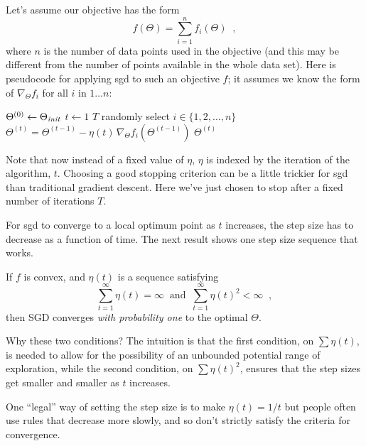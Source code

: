 Let's assume our objective has the form
\[
  f(\Theta) = \sum_{i = 1}^n f_i(\Theta)
  \;\;,
\]
where $n$ is the number of data points used in the objective (and this
may be different from the number of points available in the whole data
set).  Here is pseudocode for applying {\sc sgd} to such an objective $f$;
it assumes we know the form of $\nabla_\Theta f_i$ for all $i$ in
$1\ldots n$:
\begin{codebox}
  \li $\Theta^{(0)} \gets \Theta_{\it init}$
  \li \For $t \gets 1$ \To $T$
  \li \Do
  randomly select $i \in \{1, 2, \dots, n\}$
  \li   $\Theta^{(t)} = \Theta^{(t-1)} - \eta(t) \, \nabla_\Theta f_i(\Theta^{(t-1)})$
  \End
  \li \Return $\Theta^{(t)}$
\end{codebox}

Note that now instead of a fixed  value of $\eta$, $\eta$ is indexed by
the iteration of the algorithm, $t$.
Choosing a good stopping criterion can be a little trickier for {\sc sgd} than
traditional gradient descent. Here we've just chosen
to stop after a fixed number of iterations $T$.

For {\sc sgd} to converge to a local optimum point as $t$ increases, the
step size has to decrease as a function of time. The next result shows one
step size sequence that works.

\begin{theorem}
  If $f$ is convex, and $\eta(t)$ is a sequence satisfying
  $$ \sum_{t = 1}^{\infty}\eta(t) = \infty \;\;\text{and}\;\;
    \sum_{t = 1}^{\infty}\eta(t)^2 < \infty \;\;,$$
  then SGD converges {\em with probability one}
  to the optimal $\Theta$.
\end{theorem}

Why these two conditions?  The intuition is that the first condition,
on $\sum \eta(t)$, is needed to allow for the possibility of an
unbounded potential range of exploration, while the second condition,
on $\sum\eta(t)^2$, ensures that the step sizes get smaller and
smaller as $t$ increases.

One ``legal'' way of setting the step size is to make $\eta(t) = 1/t$ but
people often use rules that decrease more slowly, and so don't
strictly satisfy the criteria for convergence.

